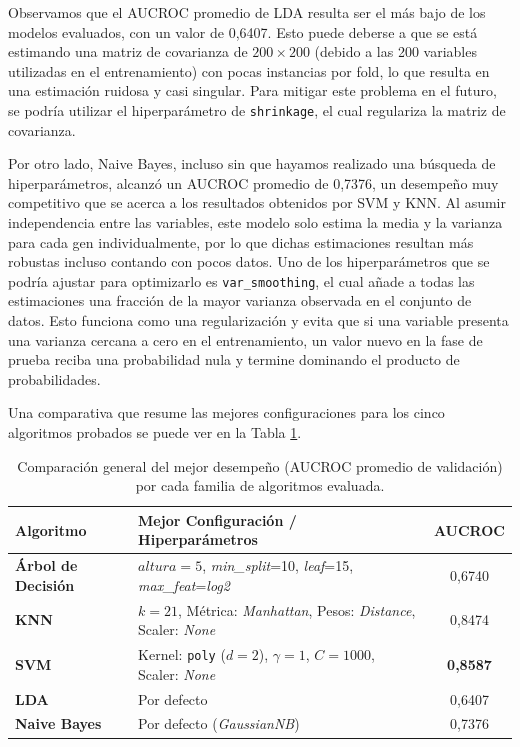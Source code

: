 \documentclass[10pt,a4paper]{article}
\begin{document}
Observamos que el AUCROC promedio de LDA resulta ser el más bajo de los modelos evaluados, con un valor de 0,6407. Esto puede deberse a que se está estimando una matriz de covarianza de $200 \times 200$ (debido a las 200 variables utilizadas en el entrenamiento) con pocas instancias por fold, lo que resulta en una estimación ruidosa y casi singular. Para mitigar este problema en el futuro, se podría utilizar el hiperparámetro de \texttt{shrinkage}, el cual regulariza la matriz de covarianza.

Por otro lado, Naive Bayes, incluso sin que hayamos realizado una búsqueda de hiperparámetros, alcanzó un AUCROC promedio de 0,7376, un desempeño muy competitivo que se acerca a los resultados obtenidos por SVM y KNN. Al asumir independencia entre las variables, este modelo solo estima la media y la varianza para cada gen individualmente, por lo que dichas estimaciones resultan más robustas incluso contando con pocos datos. Uno de los hiperparámetros que se podría ajustar para optimizarlo es \texttt{var\_smoothing}, el cual añade a todas las estimaciones una fracción de la mayor varianza observada en el conjunto de datos. Esto funciona como una regularización y evita que si una variable presenta una varianza cercana a cero en el entrenamiento, un valor nuevo en la fase de prueba reciba una probabilidad nula y termine dominando el producto de probabilidades.

Una comparativa que resume las mejores configuraciones para los cinco algoritmos probados se puede ver en la Tabla \ref{tab:comparacion_algoritmos_resumen}.

\begin{table}[H]
\centering
\small
\setlength{\tabcolsep}{10pt}
\renewcommand{\arraystretch}{1.2}

\begin{tabular}{llc}
\toprule
\textbf{Algoritmo} & \textbf{Mejor Configuración / Hiperparámetros} & \textbf{AUCROC} \\
\midrule
\textbf{Árbol de Decisión} &  $altura=5$, \textit{min\_split}=10, \textit{leaf}=15, \textit{max\_feat}=\textit{log2} & 0,6740 \\
\textbf{KNN} & $k=21$, Métrica: \textit{Manhattan}, Pesos: \textit{Distance}, Scaler: \textit{None} & 0,8474 \\
\textbf{SVM} & Kernel: \texttt{poly} ($d=2$), $\gamma=1$, $C=1000$, Scaler: \textit{None} & \textbf{0,8587} \\
\textbf{LDA} & Por defecto & 0,6407 \\
\textbf{Naive Bayes} & Por defecto (\textit{GaussianNB}) & 0,7376 \\
\bottomrule
\end{tabular}

\caption{Comparación general del mejor desempeño (AUCROC promedio de validación) por cada familia de algoritmos evaluada.}
\label{tab:comparacion_algoritmos_resumen}
\end{table}
\end{document}
